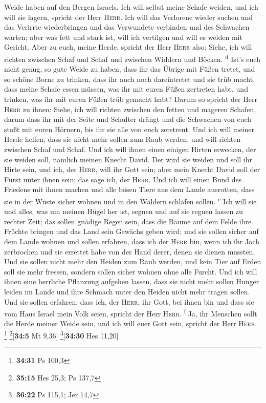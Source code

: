 Weide haben auf den Bergen Israels.  Ich will selbst
meine Schafe weiden, und ich will sie lagern, spricht der Herr
\textsc{Herr}.  Ich will das Verlorene wieder suchen und
das Verirrte wiederbringen und das Verwundete verbinden und des
Schwachen warten; aber was fett und stark ist, will ich vertilgen und
will es weiden mit Gericht.  Aber zu euch, meine Herde,
spricht der Herr \textsc{Herr} also: Siehe, ich will richten zwischen
Schaf und Schaf und zwischen Widdern und Böcken. \textsuperscript{d}
 Ist's euch nicht genug, so gute Weide zu haben, dass ihr
das Übrige mit Füßen tretet, und so schöne Borne zu trinken, dass ihr
auch noch dareintretet und sie trüb macht,  dass meine
Schafe essen müssen, was ihr mit euren Füßen zertreten habt, und
trinken, was ihr mit euren Füßen trüb gemacht habt? 
Darum so spricht der Herr \textsc{Herr} zu ihnen: Siehe, ich will
richten zwischen den fetten und mageren Schafen,  darum
dass ihr mit der Seite und Schulter drängt und die Schwachen von euch
stoßt mit euren Hörnern, bis ihr sie alle von euch zerstreut.
 Und ich will meiner Herde helfen, dass sie nicht mehr
sollen zum Raub werden, und will richten zwischen Schaf und Schaf.
 Und ich will ihnen einen einigen Hirten erwecken, der
sie weiden soll, nämlich meinen Knecht David. Der wird sie weiden und
soll ihr Hirte sein,  und ich, der \textsc{Herr}, will
ihr Gott sein; aber mein Knecht David soll der Fürst unter ihnen sein;
das sage ich, der \textsc{Herr}.  Und ich will einen Bund
des Friedens mit ihnen machen und alle bösen Tiere aus dem Lande
ausrotten, dass sie in der Wüste sicher wohnen und in den Wäldern
schlafen sollen. \textsuperscript{e}  Ich will sie und
alles, was um meinen Hügel her ist, segnen und auf sie regnen lassen zu
rechter Zeit; das sollen gnädige Regen sein,  dass die
Bäume auf dem Felde ihre Früchte bringen und das Land sein Gewächs geben
wird; und sie sollen sicher auf dem Lande wohnen und sollen erfahren,
dass ich der \textsc{Herr} bin, wenn ich ihr Joch zerbrochen und sie
errettet habe von der Hand derer, denen sie dienen mussten.
 Und sie sollen nicht mehr den Heiden zum Raub werden,
und kein Tier auf Erden soll sie mehr fressen, sondern sollen sicher
wohnen ohne alle Furcht.  Und ich will ihnen eine
herrliche Pflanzung aufgehen lassen, dass sie nicht mehr sollen Hunger
leiden im Lande und ihre Schmach unter den Heiden nicht mehr tragen
sollen.  Und sie sollen erfahren, dass ich, der
\textsc{Herr}, ihr Gott, bei ihnen bin und dass sie vom Haus Israel mein
Volk seien, spricht der Herr \textsc{Herr}. \textsuperscript{f}
 Ja, ihr Menschen sollt die Herde meiner Weide sein, und
ich will euer Gott sein, spricht der Herr \textsc{Herr}. \footnote{\textbf{34:31}
  Ps 100,3} \footnote{\textbf{35:15} Hes 25,3; Ps 137,7}{[}\textbf{34:5}
Mt 9,36{]} \footnote{\textbf{36:22} Ps 115,1; Jer 14,7}{[}\textbf{34:30}
Hes 11,20{]}

